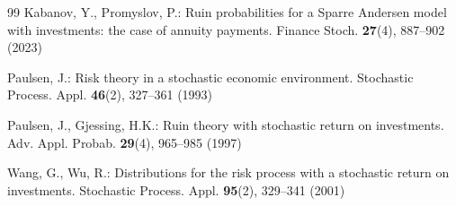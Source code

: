 \documentclass[smallextended]{svjour3}
\begin{document}
\begin{thebibliography}{99}
Kabanov, Y., Promyslov, P.: 
Ruin probabilities for a Sparre Andersen model with investments: the case of annuity payments. 
Finance Stoch. \textbf{27}(4), 887--902 (2023)

Paulsen, J.: 
Risk theory in a stochastic economic environment. 
Stochastic Process. Appl. \textbf{46}(2), 327--361 (1993)

Paulsen, J., Gjessing, H.K.: 
Ruin theory with stochastic return on investments. 
Adv. Appl. Probab. \textbf{29}(4), 965--985 (1997)

Wang, G., Wu, R.: 
Distributions for the risk process with a stochastic return on investments. 
Stochastic Process. Appl. \textbf{95}(2), 329--341 (2001)

\end{thebibliography}
\end{document}
